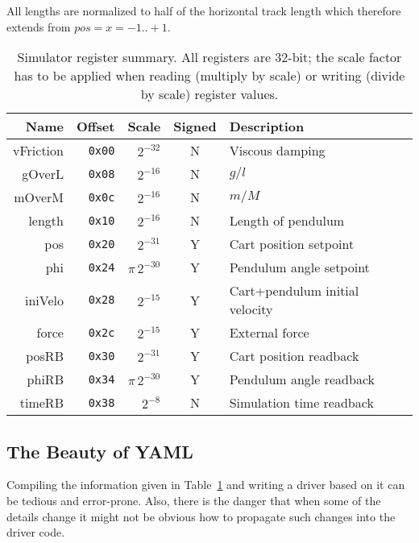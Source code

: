 \documentclass[10pt]{article}
\newcommand{\cod}[1] {{\tt#1}}
\newcounter{tbls}
\begin{document}
All lengths are normalized to half of the horizontal track length which therefore
extends from $pos = x =-1..+1$.

\begin{table}[ht]
\label{tbl:regs}
\hspace*{\fill}
\begin{tabular}{rrrcl}
         Name &     Offset & Scale        & Signed & Description       \\
\hline
    vFriction & \cod{0x00} & $2^{-32}$    & N & Viscous damping   \\
       gOverL & \cod{0x08} & $2^{-16}$    & N & $g/l$             \\
       mOverM & \cod{0x0c} & $2^{-16}$    & N & $m/M$             \\
       length & \cod{0x10} & $2^{-16}$    & N & Length of pendulum\\
          pos & \cod{0x20} & $2^{-31}$    & Y & Cart position setpoint\\
          phi & \cod{0x24} & $\pi\, 2^{-30}$& Y & Pendulum angle setpoint\\
      iniVelo & \cod{0x28} & $2^{-15}$    & Y & Cart+pendulum initial velocity\\
        force & \cod{0x2c} & $2^{-15}$    & Y & External force\\
\hline
        posRB & \cod{0x30} & $2^{-31}$    & Y & Cart position readback\\
        phiRB & \cod{0x34} & $\pi\, 2^{-30}$& Y & Pendulum angle readback\\
       timeRB & \cod{0x38} & $2^{-8}$     & N & Simulation time readback\\
\end{tabular}
\hspace*{\fill}
\caption{Simulator register summary. All registers are 32-bit; the scale factor has
to be applied when reading (multiply by scale) or writing (divide by scale) register
values.}
\end{table}

\subsection{The Beauty of YAML}
Compiling the information given in Table~\ref{tbl:regs} and writing a driver based
on it can be tedious and error-prone. Also, there is the danger that when some of
the details change it might not be obvious how to propagate such changes into the
driver code.
\end{document}
